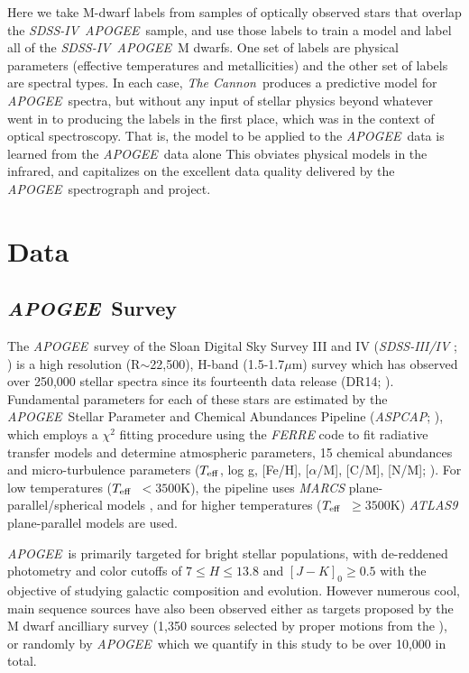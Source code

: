 \documentclass[modern]{aastex62}
\newcommand{\apogee}{\textsl{APOGEE}}
\newcommand{\thecannon}{\textsl{The Cannon}}
\newcommand{\aspcap}{\textsl{ASPCAP}}
\newcommand{\sdssiv}{\textsl{SDSS-IV}}
\newcommand{\teff}{$T_{\rm eff}$}
\begin{document}
Here we take M-dwarf labels from samples of optically observed stars that overlap the
\sdssiv\ \apogee\ sample, and use those labels to train a model and label all of the
\sdssiv\ \apogee\ M dwarfs.
One set of labels are physical parameters (effective temperatures and metallicities)
and the other set of labels are spectral types.
In each case, \thecannon\ produces a predictive model for \apogee\ spectra, but without
any input of stellar physics beyond whatever went in to producing the labels in the first
place, which was in the context of optical spectroscopy.
That is, the model to be applied to the \apogee\ data is learned from the \apogee\ data alone
This obviates physical models in the infrared, and capitalizes on the excellent data quality
delivered by the \apogee\ spectrograph and project.

\section{Data} \label{sec:data}

\subsection{\apogee\ Survey}

The \apogee\ survey \citep{Majewski:2015} of the Sloan Digital Sky Survey III and IV (\textsl{SDSS-III/IV} \citealt{Eisenstein:2011}; \citealt{Blanton:2017}) is a high resolution (R$\sim$22,500), H-band (1.5-1.7$\mu$m) survey which has observed over 250,000 stellar spectra since its fourteenth data release (DR14; \citealt{Abolfathi:2017}). Fundamental parameters for each of these stars are estimated by the \apogee\ Stellar Parameter and Chemical Abundances Pipeline (\aspcap; \citealt{Perez:2016}), which employs a $\chi^2$ fitting procedure using the \textsl{FERRE} code to fit radiative transfer models and determine atmospheric parameters, 15 chemical abundances and micro-turbulence parameters (\teff, log g, [Fe/H], [$\alpha$/M], [C/M], [N/M]; \citealt{Meszaros:2012}). For low temperatures (\teff\ $<3500$K), the pipeline uses \textsl{MARCS} plane-parallel/spherical models \citep{Gustafsson:2008}, and for higher temperatures (\teff\ $\geq3500$K) \textsl{ATLAS9} \citep{Castelli:2004} plane-parallel models are used.

\apogee\ is primarily targeted for bright stellar populations, with de-reddened photometry and color cutoffs of $7 \leq H \leq 13.8$ and $[J-K]_0 \geq 0.5$ \citep{Zasowski:2013} with the objective of studying galactic composition and evolution. However numerous cool, main sequence sources have also been observed either as targets proposed by the M dwarf ancilliary survey (1,350 sources selected by proper motions from the  \citealt{Desphande:2013}), or randomly by \apogee\, which we quantify in this study to be over 10,000 in total.
\end{document}
